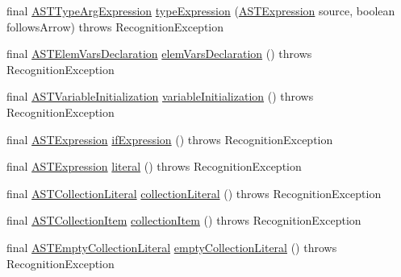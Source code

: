 \begin{DoxyCompactItemize}
\item 
final \hyperlink{classorg_1_1tzi_1_1use_1_1parser_1_1ocl_1_1_a_s_t_type_arg_expression}{A\-S\-T\-Type\-Arg\-Expression} \hyperlink{classorg_1_1tzi_1_1use_1_1parser_1_1testsuite_1_1_test_suite_parser_a80dd8b77b07bfc9fd204d0f6ee313afc}{type\-Expression} (\hyperlink{classorg_1_1tzi_1_1use_1_1parser_1_1ocl_1_1_a_s_t_expression}{A\-S\-T\-Expression} source, boolean follows\-Arrow)  throws Recognition\-Exception 
\item 
final \hyperlink{classorg_1_1tzi_1_1use_1_1parser_1_1ocl_1_1_a_s_t_elem_vars_declaration}{A\-S\-T\-Elem\-Vars\-Declaration} \hyperlink{classorg_1_1tzi_1_1use_1_1parser_1_1testsuite_1_1_test_suite_parser_a360fd2ccd589203cc7b2089346d95d1e}{elem\-Vars\-Declaration} ()  throws Recognition\-Exception 
\item 
final \hyperlink{classorg_1_1tzi_1_1use_1_1parser_1_1ocl_1_1_a_s_t_variable_initialization}{A\-S\-T\-Variable\-Initialization} \hyperlink{classorg_1_1tzi_1_1use_1_1parser_1_1testsuite_1_1_test_suite_parser_ad818e6fd323fde04c77af86157403988}{variable\-Initialization} ()  throws Recognition\-Exception 
\item 
final \hyperlink{classorg_1_1tzi_1_1use_1_1parser_1_1ocl_1_1_a_s_t_expression}{A\-S\-T\-Expression} \hyperlink{classorg_1_1tzi_1_1use_1_1parser_1_1testsuite_1_1_test_suite_parser_a6fce1fc7a0069582ebf340c1f0e66d4c}{if\-Expression} ()  throws Recognition\-Exception 
\item 
final \hyperlink{classorg_1_1tzi_1_1use_1_1parser_1_1ocl_1_1_a_s_t_expression}{A\-S\-T\-Expression} \hyperlink{classorg_1_1tzi_1_1use_1_1parser_1_1testsuite_1_1_test_suite_parser_ad5933a8374fe711498964eea86409942}{literal} ()  throws Recognition\-Exception 
\item 
final \hyperlink{classorg_1_1tzi_1_1use_1_1parser_1_1ocl_1_1_a_s_t_collection_literal}{A\-S\-T\-Collection\-Literal} \hyperlink{classorg_1_1tzi_1_1use_1_1parser_1_1testsuite_1_1_test_suite_parser_a7dbf78870802f2ec5a05a257d4d70151}{collection\-Literal} ()  throws Recognition\-Exception 
\item 
final \hyperlink{classorg_1_1tzi_1_1use_1_1parser_1_1ocl_1_1_a_s_t_collection_item}{A\-S\-T\-Collection\-Item} \hyperlink{classorg_1_1tzi_1_1use_1_1parser_1_1testsuite_1_1_test_suite_parser_ae30e58a10260444135182857a6758a5c}{collection\-Item} ()  throws Recognition\-Exception 
\item 
final \hyperlink{classorg_1_1tzi_1_1use_1_1parser_1_1ocl_1_1_a_s_t_empty_collection_literal}{A\-S\-T\-Empty\-Collection\-Literal} \hyperlink{classorg_1_1tzi_1_1use_1_1parser_1_1testsuite_1_1_test_suite_parser_afb54b05875a1ec0401ea182435117e6c}{empty\-Collection\-Literal} ()  throws Recognition\-Exception 

\end{DoxyCompactItemize}
